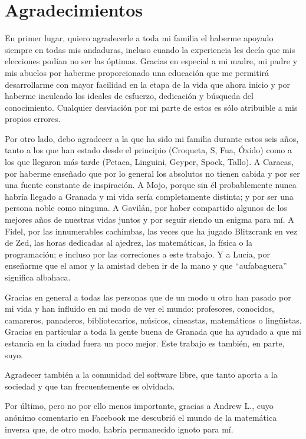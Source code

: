 \documentclass['../proyecto.tex']{memoir}
\begin{document}
\chapter*{Agradecimientos}

En primer lugar, quiero agradecerle a toda mi familia el haberme apoyado siempre en todas mis andaduras, incluso cuando la experiencia les decía que mis elecciones podían no ser las óptimas. Gracias en especial a mi madre, mi padre y mis abuelos por haberme proporcionado una educación que me permitirá desarrollarme con mayor facilidad en la etapa de la vida que ahora inicio y por haberme inculcado los ideales de esfuerzo, dedicación y búsqueda del conocimiento. Cualquier desviación por mi parte de estos es sólo atribuible a mis propios errores.

Por otro lado, debo agradecer a la que ha sido mi familia durante estos seis años, tanto a los que han estado desde el principio (Croqueta, S, Fua, Óxido) como a los que llegaron más tarde (Petaca, Linguini, Geyper, Spock, Tallo). A Caracas, por haberme enseñado que por lo general los absolutos no tienen cabida y por ser una fuente constante de inspiración. A Mojo, porque sin él probablemente nunca habría llegado a Granada y mi vida sería completamente distinta; y por ser una persona noble como ninguna. A Gavilán, por haber compartido algunos de los mejores años de nuestras vidas juntos y por seguir siendo un enigma para mí. A Fidel, por las innumerables cachimbas, las veces que ha jugado Blitzcrank en vez de Zed, las horas dedicadas al ajedrez, las matemáticas, la física o la programación; e incluso por las correciones a este trabajo. Y a Lucía, por enseñarme que el amor y la amistad deben ir de la mano y que ``aufabaguera'' significa albahaca.

Gracias en general a todas las personas que de un modo u otro han pasado por mi vida y han influido en mi modo de ver el mundo: profesores, conocidos, camareros, panaderos, bibliotecarios, músicos, cineastas, matemáticos o lingüistas. Gracias en particular a toda la gente buena de Granada que ha ayudado a que mi estancia en la ciudad fuera un poco mejor. Este trabajo es también, en parte, suyo.

Agradecer también a la comunidad del software libre, que tanto aporta a la sociedad y que tan frecuentemente es olvidada.

Por último, pero no por ello menos importante, gracias a Andrew L., cuyo anónimo comentario en Facebook me descubrió el mundo de la matemática inversa que, de otro modo, habría permanecido ignoto para mí.

\thispagestyle{empty}

\vspace{1cm}

\newpage
\end{document}
